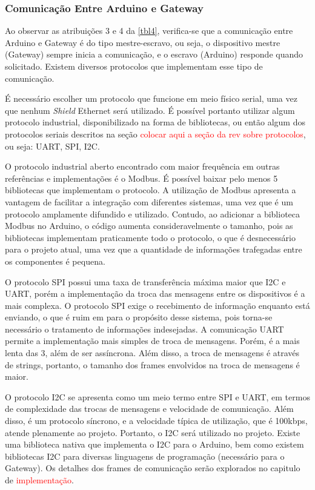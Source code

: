 			\subsubsection{Comunicação Entre Arduino e Gateway}
				Ao observar as atribuições 3 e 4 da \autoref{tbl4}, verifica-se que a comunicação entre Arduino e Gateway é do tipo mestre-escravo, ou seja, o dispositivo mestre (Gateway) sempre inicia a comunicação, e o escravo (Arduino) responde quando solicitado. Existem diversos protocolos que implementam esse tipo de comunicação.
				
				É necessário escolher um protocolo que funcione em meio físico serial, uma vez que nenhum \textit{Shield} Ethernet será utilizado. É possível portanto utilizar algum protocolo industrial, disponibilizado na forma de bibliotecas, ou então algum dos protocolos seriais descritos na seção \textcolor{red}{colocar aqui a seção da rev sobre protocolos}, ou seja: UART, SPI, I2C.
				
				O protocolo industrial aberto encontrado com maior frequência em outras referências e implementações é o Modbus. É possível baixar pelo menos 5 bibliotecas que implementam o protocolo. A utilização de Modbus apresenta a vantagem de facilitar a integração com diferentes sistemas, uma vez que é um protocolo amplamente difundido e utilizado. Contudo, ao adicionar a biblioteca Modbus no Arduino, o código aumenta consideravelmente o tamanho, pois as bibliotecas implementam praticamente todo o protocolo, o que é desnecessário para o projeto atual, uma vez que a quantidade de informações trafegadas entre os componentes é pequena.
				
				O protocolo SPI possui uma taxa de transferência máxima maior que I2C e UART, porém a implementação da troca das mensagens entre os dispositivos é a mais complexa. O protocolo SPI exige o recebimento de informação enquanto está enviando, o que é ruim em para o propósito desse sistema, pois torna-se necessário o tratamento de informações indesejadas. A comunicação UART permite a implementação mais simples de troca de mensagens. Porém, é a mais lenta das 3, além de ser assíncrona. Além disso, a troca de mensagens é através de strings, portanto, o tamanho dos frames envolvidos na troca de mensagens é maior. 
				
				O protocolo I2C se apresenta como um meio termo entre SPI e UART, em termos de complexidade das trocas de mensagens e velocidade de comunicação. Além disso, é um protocolo síncrono, e a velocidade típica de utilização, que é 100kbps, atende plenamente ao projeto.
				Portanto, o I2C será utilizado no projeto. Existe uma biblioteca nativa que implementa o I2C para o Arduino, bem como existem bibliotecas I2C para diversas linguagens de programação (necessário para o Gateway). Os detalhes dos frames de comunicação serão explorados no capitulo de \textcolor{red}{implementação}.
			
